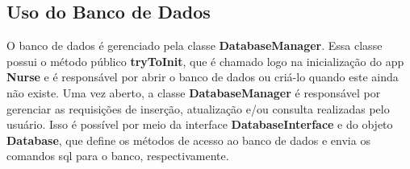 \subsection{Uso do Banco de Dados}
\label{cap4:Sec:UsoBancoDados}
O banco de dados é gerenciado pela classe \textbf{DatabaseManager}. Essa classe possui o método público \textbf{tryToInit}, que é chamado logo na inicialização do app \textbf{Nurse} e é responsável por abrir o banco de dados ou criá-lo quando este ainda não existe. Uma vez aberto, a classe \textbf{DatabaseManager} é responsável por gerenciar as requisições de inserção, atualização e/ou consulta realizadas pelo usuário. Isso é possível por meio da interface \textbf{DatabaseInterface} e do objeto \textbf{Database}, que define os métodos de acesso ao banco de dados e envia os comandos sql para o banco, respectivamente.
















